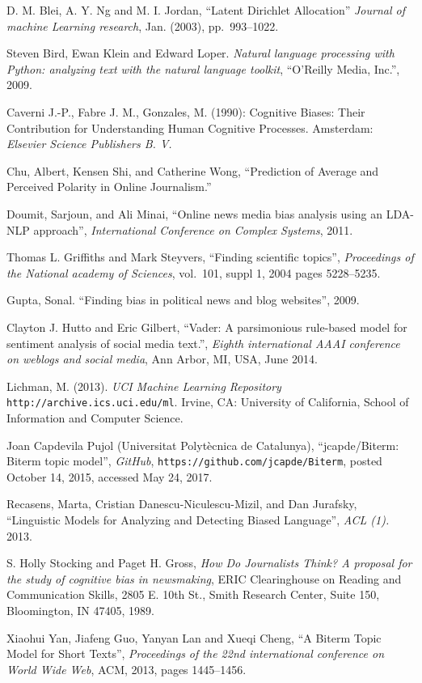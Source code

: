 \documentclass[final]{ieee}
\begin{document}
           
\begin{thebibliography}{99}
 D. M. Blei, A. Y. Ng and M. I. Jordan, ``Latent Dirichlet Allocation'' {\it Journal of machine Learning research},  Jan. (2003), pp.~993--1022.

 Steven Bird, Ewan Klein and Edward Loper. {\it Natural language processing with Python: analyzing text with the natural language toolkit}, ``O'Reilly Media, Inc.'', 2009.

 Caverni J.-P., Fabre J. M., Gonzales, M. (1990): Cognitive Biases: Their Contribution for Understanding Human Cognitive Processes. Amsterdam: {\it Elsevier Science Publishers B. V.}

 Chu, Albert, Kensen Shi, and Catherine Wong, ``Prediction of Average and Perceived Polarity in Online Journalism.''

 Doumit, Sarjoun, and Ali Minai, ``Online news media bias analysis using an LDA-NLP approach'', {\it International Conference on Complex Systems}, 2011.

 Thomas L. Griffiths and Mark Steyvers, ``Finding scientific topics'', {\it Proceedings of the National academy of Sciences}, vol.~101, suppl 1, 2004 pages 5228--5235.

 Gupta, Sonal. ``Finding bias in political news and blog websites'', 2009.

 Clayton J. Hutto and Eric Gilbert, 
   ``Vader: A parsimonious rule-based model for sentiment analysis of social media text.'', {\it  Eighth international AAAI conference on weblogs and social media}, Ann Arbor, MI, USA, June 2014.

 Lichman, M. (2013). {\it UCI Machine Learning Repository} \texttt{http://archive.ics.uci.edu/ml}. Irvine, CA: University of California, School of Information and Computer Science.

 Joan Capdevila Pujol (Universitat Polyt\`{e}cnica de Catalunya), ``jcapde/Biterm: Biterm topic model'', {\it GitHub}, \texttt{https://github.com/jcapde/Biterm}, posted October 14, 2015, accessed May 24, 2017.

 Recasens, Marta, Cristian Danescu-Niculescu-Mizil, and Dan Jurafsky, ``Linguistic Models for Analyzing and Detecting Biased Language'', {\it ACL (1).} 2013.

 S. Holly Stocking and Paget H. Gross, {\it How Do Journalists Think? A proposal for the study of cognitive bias in newsmaking}, ERIC Clearinghouse on Reading and Communication Skills, 2805 E. 10th St., Smith Research Center, Suite 150, Bloomington, IN 47405, 1989.

 Xiaohui Yan, Jiafeng Guo, Yanyan Lan and Xueqi Cheng, 
   ``A Biterm Topic Model for Short Texts'', {\it Proceedings of the 22nd international conference on 
   World Wide Web}, ACM, 2013, pages 1445--1456.


   
\end{thebibliography}
\end{document}
